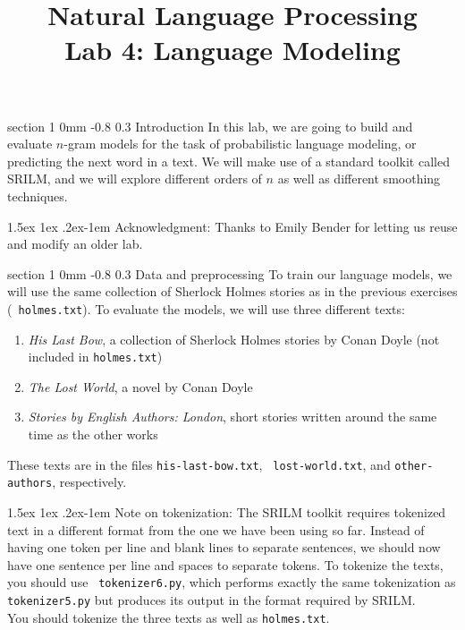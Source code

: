 \documentclass[11pt]{article}
\title{{\LARGE Natural Language Processing}\\[1.5mm]{\large Lab 4: Language Modeling}}
\author{}
\date{} %
\makeatletter
\newcommand{\newsec}[2]{\section{#1}\label{sec:#2}\noindent}
\renewcommand{\section}{\@startsection
{section}%
{1}%
{0mm}%
{-0.8\baselineskip}%
{0.3\baselineskip}%
{\bfseries\large}}%
\renewcommand{\paragraph}{%
  \@startsection{paragraph}{4}%
  {\z@}{1.5ex \@plus 1ex \@minus .2ex}{-1em}%
  {\normalfont\normalsize\bfseries}%
}\makeatother
\makeatother
\begin{document}
 

\maketitle
\vspace{-2mm}
\newsec{Introduction}{intro}%
In this lab, we are going to build and evaluate $n$-gram models %
for the task of probabilistic language modeling, or predicting the next word in a text. We will make use
of a standard toolkit called SRILM, and we will explore different orders of $n$ as well as different smoothing techniques. 

\paragraph{Acknowledgment:} Thanks to Emily Bender for letting us reuse
and modify an older lab.

\newsec{Data and preprocessing}{data}%
To train our language models, we will use the same collection of
Sherlock Holmes stories as in the previous exercises ({\tt
  holmes.txt}).  To evaluate the models, we will use three different
texts:
\begin{enumerate}[noitemsep,topsep=0.2cm]
\item \emph{His Last Bow}, a collection of Sherlock Holmes stories by
  Conan Doyle (not included in {\tt holmes.txt})
\item \emph{The Lost World}, a novel by Conan Doyle
\item \emph{Stories by English Authors: London}, short stories written
  around the same time as the other works
\end{enumerate}
These texts are in the files {\tt his-last-bow.txt}, {\tt
  lost-world.txt}, and {\tt other-authors}, respectively.

\paragraph{Note on tokenization:} The SRILM toolkit requires tokenized
text in a different format from the one we have been using so far.
Instead of having one token per line and blank lines to separate
sentences, we should now have one sentence per line and spaces to
separate tokens.  To tokenize the texts, you should use {\tt
  tokenizer6.py}, which performs exactly the same tokenization as {\tt
  tokenizer5.py} but produces its output in the format required by
SRILM.\\
You should tokenize the three texts as well as {\tt holmes.txt}.
\end{document}
